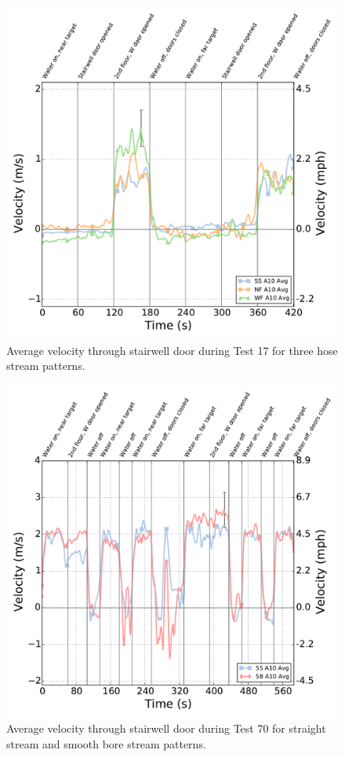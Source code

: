\documentclass[12pt,oneside]{book}
\begin{document}
\begin{figure}[!ht]
	\includegraphics[width=\columnwidth]{../Figures/Plots/Test_17_West_063014_BDP_A10_stream_avgs}
	\caption{Average velocity through stairwell door during Test 17 for three hose stream patterns.}
	\label{fig:Test_17_BDP_A10_Avg_All}
	\end{figure}
\FloatBarrier

\begin{figure}[!ht]
	\includegraphics[width=\columnwidth]{../Figures/Plots/Test_70_West_101215_BDP_A10_stream_avgs}
	\caption{Average velocity through stairwell door during Test 70 for straight stream and smooth bore stream patterns.}
	\label{fig:Test_70_BDP_A10_Avg_All}
	\end{figure}
\FloatBarrier
\end{document}
